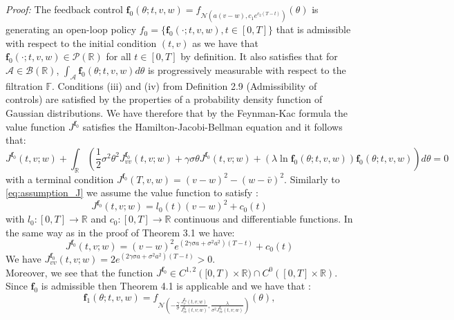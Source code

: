 \documentclass[oneside, a4paper, onecolumn, 11pt]{article}
\begin{document}
\textit{Proof:}
The feedback control $\boldsymbol{f}_0(\theta;t,v,w) = f_{\mathcal{N}( a(v-w), c_1e^{c_2(T-t)})}(\theta)$ is generating an open-loop policy $f_0 = \{\boldsymbol{f}_0(\cdot;t,v,w), t\in [0,T]\}$ that is admissible with respect to the initial condition $(t,v)$ as we have that $\boldsymbol{f}_0(\cdot;t,v,w) \in \mathcal{P}(\mathbb{R})$  for all $t\in [0,T]$ by definition. It also satisfies that for $\mathcal{A} \in \mathcal{B}(\mathbb{R})$, $\int_{\mathcal{A}}\boldsymbol{f}_0(\theta;t,v,w)d\theta$ is progressively measurable with respect to the filtration $\mathbb{F}$. Conditions (iii) and (iv) from Definition 2.9 (Admissibility of controls) are satisfied by the properties of a probability density function of Gaussian distributions. We have therefore that by the Feynman-Kac formula the value function $J^{\boldsymbol{f}_0}$ satisfies the Hamilton-Jacobi-Bellman equation and it follows that: 
\begin{equation}
  J^{\boldsymbol{f}_0}(t,v;w) + \int_\mathbb{R}\left(\frac{1}{2}\sigma^2\theta^2 J_{vv}^{\boldsymbol{f}_0}(t,v;w)  + \gamma\sigma\theta J^{\boldsymbol{f}_0}(t,v;w)  + (\lambda \ln \boldsymbol{f}_0(\theta;t,v,w))\boldsymbol{f}_0(\theta;t,v,w)\right)d\theta = 0
\end{equation}
with a terminal condition $J^{\boldsymbol{f}_0}(T,v, w)= (v-w)^2 -(w-\bar{v})^2$. 
Similarly to \eqref{eq:assumption_J} we assume the value function to satisfy : 
\begin{equation*}
J^{\boldsymbol{f}_0}(t,v;w) = l_0(t)(v-w)^2 + c_0(t)
\end{equation*}
with $l_0:[0,T] \to \mathbb{R}$ and $c_0:[0,T] \to \mathbb{R}$ continuous and differentiable functions. In the same way as in the proof of Theorem 3.1 we have:
\begin{equation*}
    J^{\boldsymbol{f}_0}(t,v;w) = (v-w)^2e^{(2\gamma\sigma a + \sigma^2 a^2)(T-t)} + c_0(t)
\end{equation*}
We have $ J_{vv}^{\boldsymbol{f}_0}(t,v;w) = 2 e^{(2\gamma\sigma a + \sigma^2 a^2)(T-t)} > 0 $. \\Moreover, we see that the function $J^{\boldsymbol{f}_0} \in C^{1,2}([0,T) \times \mathbb{R}) \cap C^0([0,T] \times \mathbb{R})$. Since $\boldsymbol{f}_0$ is admissible then Theorem 4.1 is applicable and we have that : 
\begin{equation*}
    \boldsymbol{f}_1(\theta;t,v,w) = f_{\mathcal{N}\left(-\frac{\gamma}{\sigma} \frac{J^{\boldsymbol{f}_0}_v(t,v;w)}{J^{\boldsymbol{f}_0}_{vv}(t,v;w)}, \frac{\lambda}{\sigma^2J^{\boldsymbol{f}_0}_{vv}(t,v;w)} \right)}(\theta),
\end{equation*}
\end{document}
